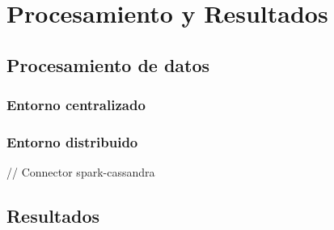 
\pagestyle{fancy}

\chapter{Procesamiento y Resultados}
\label{procesamiento_datos}



\section{Procesamiento de datos}

\subsection{Entorno centralizado}

\subsection{Entorno distribuido}

// Connector spark-cassandra


\section{Resultados}





